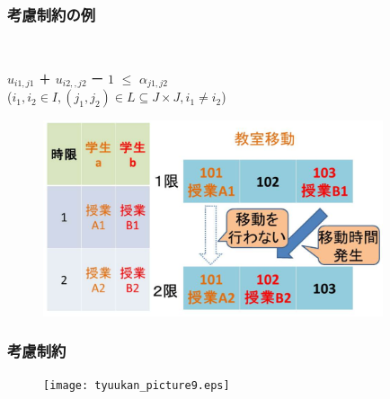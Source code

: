 \documentclass[dvipdfmx,12pt]{beamer}
\begin{document}
\begin{frame}
 \frametitle{\LARGE 考慮制約の例}

\\
\begin{center}
{\Large $u_{i1,j1}$ ＋ $u_{i2,,j2}$ ー $1$ $\leq$ $\alpha_{j1,j2}$}\\
\vspace{2.0mm}
{\Large ($i_1,i_2 \in I,(j_1,j_2) \in L \subseteq J \times J,i_1 \neq i_2$)}
\vspace{0mm}
\begin{figure}[htbp]
 \begin{center}
  \includegraphics[width=100mm]{soturon_pre8.eps}
 \end{center}

\end{figure}
\end{center}
\end{frame}




\begin{frame}
  \frametitle{\LARGE 考慮制約}

\end{frame}
\begin{frame}
\vspace{5.0mm}
\begin{figure}[htbp]
 \begin{center}
  \texttt{[image: tyuukan\_picture9.eps]}
 \end{center}
\end{figure}
\end{frame}
\fi
\end{document}
